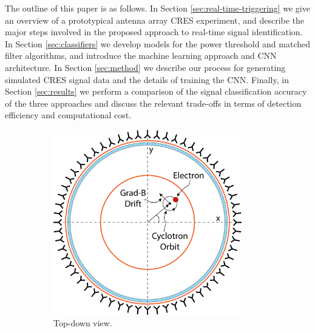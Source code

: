 The outline of this paper is as follows. In Section \ref{sec:real-time-triggering} we give an overview of a prototypical antenna array CRES experiment, and describe the major steps involved in the proposed approach to real-time signal identification. In Section \ref{sec:classifiers} we develop models for the power threshold and matched filter algorithms, and introduce the machine learning approach and CNN architecture. In Section \ref{sec:method} we describe our process for generating simulated CRES signal data and the details of training the CNN. Finally, in Section \ref{sec:results} we perform a comparison of the signal classification accuracy of the three approaches and discuss the relevant trade-offs in terms of detection efficiency and computational cost.

\begin{figure}[h]
    \centering
    \begin{subfigure}{0.48\textwidth}
        \centering
        \includegraphics[width=0.9\textwidth]{figs/Chapter-4/230328_deepfilter_paper_apparatus_concept_top_v2.png}
        \caption{Top-down view.}
        \label{fig:apparatus_concept_top}
    \end{subfigure}
    \begin{subfigure}{0.48\textwidth}
        \centering

\end{subfigure}
\end{figure}
